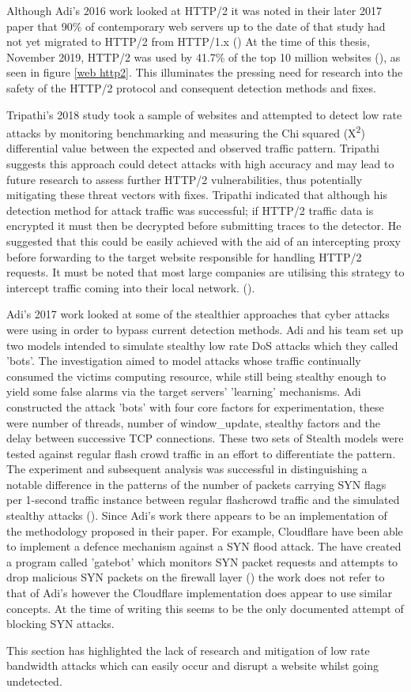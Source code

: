 
Although Adi's 2016 work looked at HTTP/2 it was noted in their later 2017 paper that 90\% of contemporary web servers up to the date of that study had not yet migrated to HTTP/2 from HTTP/1.x (\cite{adi2017stealthy}) At the time of this thesis, November 2019, HTTP/2 was used by 41.7\% of the top 10 million websites (\cite{w3techs}), as seen in figure \ref{web http2}. This illuminates the pressing need for research into the safety of the HTTP/2 protocol and consequent detection methods and fixes. 
 
Tripathi's 2018 study took a sample of websites and attempted to detect low rate attacks by monitoring benchmarking and measuring the Chi squared (X\textsuperscript{\small2}) differential value between the expected and observed traffic pattern. Tripathi suggests this approach could detect attacks with high accuracy and may lead to future research to assess further HTTP/2 vulnerabilities, thus potentially mitigating these threat vectors with fixes. Tripathi indicated that although his detection method for attack traffic was successful; if HTTP/2 traffic data is encrypted it must then be decrypted before submitting traces to the detector. He suggested that this could be easily achieved with the aid of an intercepting proxy before forwarding to the target website responsible for handling HTTP/2 requests. It must be noted that most large companies are utilising this strategy to intercept traffic coming into their local network. (\cite{tripathi2018slow}). 

Adi's 2017 work looked at some of the stealthier approaches that cyber attacks were using in order to bypass current detection methods. Adi and his team set up two models intended to simulate stealthy low rate DoS attacks which they called 'bots'. The investigation aimed to model attacks whose traffic continually consumed the victims computing resource, while still being stealthy enough to yield some false alarms via the target servers' 'learning' mechanisms. Adi constructed the attack 'bots' with four core factors for experimentation, these were number of threads, number of window\_update, stealthy factors and the delay between successive TCP connections. These two sets of Stealth models were tested against regular flash crowd traffic in an effort to differentiate the pattern. The experiment and subsequent analysis was successful in distinguishing a notable difference in the patterns of the number of packets carrying SYN flags per 1-second traffic instance between regular flashcrowd traffic and the simulated stealthy attacks (\cite{adi2017stealthy}). Since Adi's work there appears to be an implementation of the methodology proposed in their paper. For example, Cloudflare have been able to implement a defence mechanism against a SYN flood attack. The have created a program called 'gatebot' which monitors SYN packet requests and attempts to drop malicious SYN packets on the firewall layer (\cite{CFSYN}) the work does not refer to that of Adi's however the Cloudflare implementation does appear to use similar concepts. At the  time of writing this seems to be the only documented attempt of blocking SYN attacks.

This section has highlighted the lack of research and mitigation of low rate bandwidth attacks which can easily occur and disrupt a website whilst going undetected.